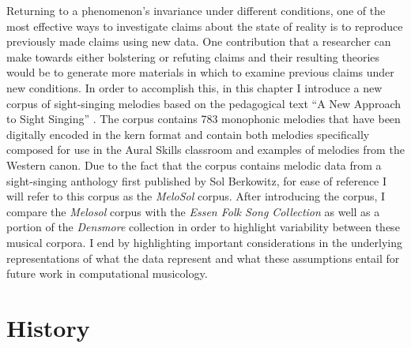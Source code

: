 \documentclass[12pt,]{book}
\begin{document}
Returning to a phenomenon's invariance under different conditions, one of the most effective ways to investigate claims about the state of reality is to reproduce previously made claims using new data.
One contribution that a researcher can make towards either bolstering or refuting claims and their resulting theories would be to generate more materials in which to examine previous claims under new conditions.
In order to accomplish this, in this chapter I introduce a new corpus of sight-singing melodies based on the pedagogical text ``A New Approach to Sight Singing'' \citep{berkowitzNewApproachSight2011}.
The corpus contains 783 monophonic melodies that have been digitally encoded in the kern format \citep{huronHumdrumToolkitReference1994} and contain both melodies specifically composed for use in the Aural Skills classroom and examples of melodies from the Western canon.
Due to the fact that the corpus contains melodic data from a sight-singing anthology first published by Sol Berkowitz, for ease of reference I will refer to this corpus as the \emph{MeloSol} corpus.
After introducing the corpus, I compare the \emph{Melosol} corpus with the \emph{Essen Folk Song Collection} \citep{schaffrathEssenFolkSong1995} as well as a portion of the \emph{Densmore} collection \citep{shanahanDENSMORECOLLECTIONNATIVE2014} in order to highlight variability between these musical corpora.
I end by highlighting important considerations in the underlying representations of what the data represent and what these assumptions entail for future work in computational musicology.

\hypertarget{history}{%
\section{History}\label{history}}
\end{document}
